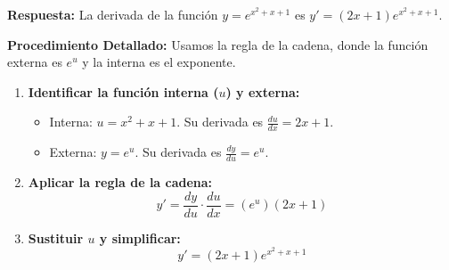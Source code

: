 \documentclass[12pt, a4paper]{article}
\begin{document}
\textbf{Respuesta:}
La derivada de la función $y=e^{x^2+x+1}$ es $y'=(2x+1)e^{x^2+x+1}$.

\textbf{Procedimiento Detallado:}
Usamos la regla de la cadena, donde la función externa es $e^u$ y la interna es el exponente.
\begin{enumerate}
    \item \textbf{Identificar la función interna ($u$) y externa:}
    \begin{itemize}
        \item Interna: $u=x^2+x+1$. Su derivada es $\frac{du}{dx}=2x+1$.
        \item Externa: $y=e^u$. Su derivada es $\frac{dy}{du}=e^u$.
    \end{itemize}
    \item \textbf{Aplicar la regla de la cadena:}
    \[y'=\frac{dy}{du}\cdot\frac{du}{dx}=(e^u)(2x+1)\]
    \item \textbf{Sustituir $u$ y simplificar:}
    \[y'=(2x+1)e^{x^2+x+1}\]
\end{enumerate}
\end{document}
